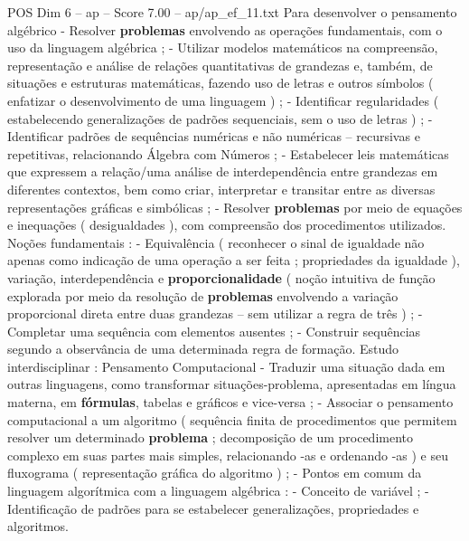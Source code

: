 \begin{textsample}{POS Dim 6 – ap – Score 7.00 – ap/ap\_ef\_11.txt}
Para desenvolver o pensamento algébrico - Resolver \textbf{problemas} envolvendo as operações fundamentais, com o uso da linguagem algébrica ; - Utilizar modelos matemáticos na compreensão, representação e análise de relações quantitativas de grandezas e, também, de situações e estruturas matemáticas, fazendo uso de letras e outros símbolos ( enfatizar o desenvolvimento de uma linguagem ) ; - Identificar regularidades ( estabelecendo generalizações de padrões sequenciais, sem o uso de letras ) ; - Identificar padrões de sequências numéricas e não numéricas – recursivas e repetitivas, relacionando Álgebra com Números ; - Estabelecer leis matemáticas que expressem a relação/uma análise de interdependência entre grandezas em diferentes contextos, bem como criar, interpretar e transitar entre as diversas representações gráficas e simbólicas ; - Resolver \textbf{problemas} por meio de equações e inequações ( desigualdades ), com compreensão dos procedimentos utilizados.
Noções fundamentais : - Equivalência ( reconhecer o sinal de igualdade não apenas como indicação de uma operação a ser feita ; propriedades da igualdade ), variação, interdependência e \textbf{proporcionalidade} ( noção intuitiva de função explorada por meio da resolução de \textbf{problemas} envolvendo a variação proporcional direta entre duas grandezas – sem utilizar a regra de três ) ; - Completar uma sequência com elementos ausentes ; - Construir sequências segundo a observância de uma determinada regra de formação.
Estudo interdisciplinar : Pensamento Computacional - Traduzir uma situação dada em outras linguagens, como transformar situações-problema, apresentadas em língua materna, em \textbf{fórmulas}, tabelas e gráficos e vice-versa ; - Associar o pensamento computacional a um algoritmo ( sequência finita de procedimentos que permitem resolver um determinado \textbf{problema} ; decomposição de um procedimento complexo em suas partes mais simples, relacionando -as e ordenando -as ) e seu fluxograma ( representação gráfica do algoritmo ) ; - Pontos em comum da linguagem algorítmica com a linguagem algébrica : - Conceito de variável ; - Identificação de padrões para se estabelecer generalizações, propriedades e algoritmos.

\end{textsample}
